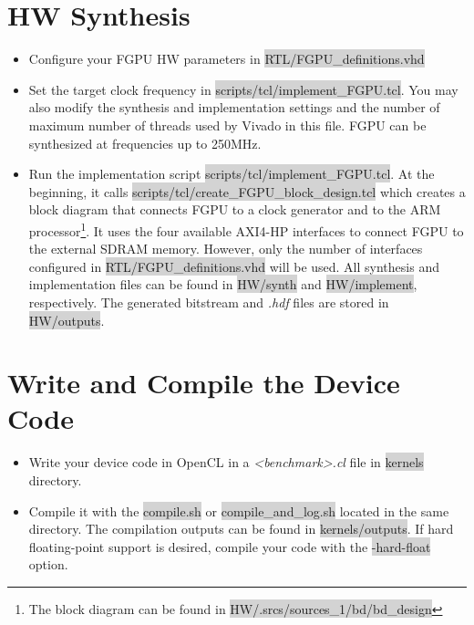 \documentclass[11pt]{article}
\begin{document}
\section{HW Synthesis}

\begin{itemize}
  \item Configure your FGPU HW parameters in \colorbox{lightGray}{RTL/FGPU\_definitions.vhd}
  \item Set the target clock frequency in \colorbox{lightGray}{scripts/tcl/implement\_FGPU.tcl}. 
    You may also modify the synthesis and implementation settings and the number of maximum number of threads used by Vivado in this file.
    FGPU can be synthesized at frequencies up to 250MHz.
  \item Run the implementation script \colorbox{lightGray}{scripts/tcl/implement\_FGPU.tcl}. 
    At the beginning, it calls \colorbox{lightGray}{scripts/tcl/create\_FGPU\_block\_design.tcl} 
    which creates a block diagram that connects FGPU to a clock generator and to the ARM processor\footnote{
      The block diagram can be found in \colorbox{lightGray}{HW/.srcs/sources\_1/bd/bd\_design}}.
    It uses the four available AXI4-HP interfaces to connect FGPU to the external SDRAM memory. 
    However, only the number of interfaces configured in \colorbox{lightGray}{RTL/FGPU\_definitions.vhd} will be used.
    All synthesis and implementation files can be found in 
    \colorbox{lightGray}{HW/synth} and \colorbox{lightGray}{HW/implement}, respectively.
    The generated bitstream and \emph{.hdf} files are stored in \colorbox{lightGray}{HW/outputs}.
\end{itemize}

\section{Write and Compile the Device Code}
\begin{itemize}
  \item Write your device code in OpenCL in a \emph{<benchmark>.cl} file in \colorbox{lightGray}{kernels} directory.
  \item Compile it with the \colorbox{lightGray}{compile.sh} or \colorbox{lightGray}{compile\_and\_log.sh} located in the same directory. 
    The compilation outputs can be found in \colorbox{lightGray}{kernels/outputs}.
    If hard floating-point support is desired, compile your code with the \colorbox{lightGray}{-hard-float} option.
\end{itemize}
\end{document}
